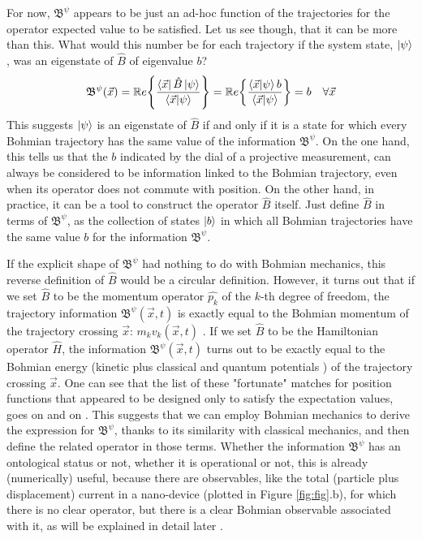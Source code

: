 \documentclass[11pt, a4paper]{article} %
\newcommand{\B}{\mathfrak{B}}
\begin{document}
For now, $\B^\psi$ appears to be just an ad-hoc function of the trajectories for the operator expected value to be satisfied. Let us see though, that it can be more than this. What would this number be for each trajectory if the system state, $\ket{\psi}$, was an eigenstate of $\hat{B}$ of eigenvalue $b$?\vspace{-0.1cm}
\begin{equation}
\B^\psi(\vec{x})=\mathbb{R}e\qty{ \frac{\bra{\vec{x}}\hat{B}\ket{\psi}}{\bra{\vec{x}}\ket{\psi}} } = \mathbb{R}e\qty{ \frac{\bra{\vec{x}}\ket{\psi}b}{\bra{\vec{x}}\ket{\psi}} }=b\quad \forall \vec{x}\vspace{-0.1cm}
\end{equation}
This suggests $\ket{\psi}$ is an eigenstate of $\hat{B}$ if and only if it is a state for which every Bohmian trajectory has the same value of the information $\B^\psi$. On the one hand, this tells us that the $b$ indicated by the dial of a projective measurement, can always be considered to be information linked to the Bohmian trajectory, even when its operator does not commute with position. On the other hand, in practice, it can be a tool to construct the operator $\hat{B}$ itself. Just define $\hat{B}$ in terms of $\B^\psi$, as the collection of states $\ket{b}$ in which all Bohmian trajectories have the same value $b$ for the information $\B^\psi$.

If the explicit shape of $\B^\psi$ had nothing to do with Bohmian mechanics, this reverse definition of $\hat{B}$ would be a circular definition. However, it turns out that if we set $\hat{B}$ to be the momentum operator $\hat{p_k}$ of the $k$-th degree of freedom, the trajectory information $\B^\psi(\vec{x},t)$ is exactly equal to the Bohmian momentum of the trajectory crossing $\vec{x}$: $m_k v_k(\vec{x},t)$ \cite{DevInPosition1}. If we set $\hat{B}$ to be the Hamiltonian operator $\hat{H}$, the information $\B^\psi(\vec{x},t)$ turns out to be exactly equal to the Bohmian energy (kinetic plus classical and quantum potentials \cite{JordiXavier}) of the trajectory crossing $\vec{x}$. One can see that the list of these "fortunate" matches for position functions that appeared to be designed only to satisfy the expectation values, goes on and on \cite{Holland}. This suggests that we can employ Bohmian mechanics to derive the expression for $\B^\psi$, thanks to its similarity with classical mechanics, and then define the related operator in those terms. Whether the information $\B^\psi$ has an ontological status or not, whether it is operational or not, this is already (numerically) useful, because there are observables, like the total (particle plus  displacement) current in a nano-device (plotted in Figure \ref{fig:fig}.b), for which there is no clear operator, but there is a clear Bohmian observable associated with it, as will be explained in detail later \cite{Pel, equiv}.
\end{document}
